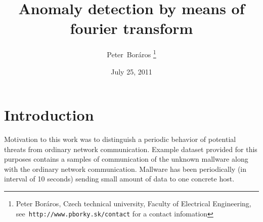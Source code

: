 \documentclass[a4paper]{IEEEtran}
\begin{document}
\title{Anomaly detection by means of fourier transform}
\date{July 25, 2011}
\author{Peter~Boráros %
\thanks{{Peter Boráros}, Czech technical university, Faculty of Electrical Engineering,
see~\texttt{http://www.pborky.sk/contact} for a contact infomation}}%



\maketitle
\IEEEdisplaynotcompsoctitleabstractindextext
\IEEEpeerreviewmaketitle


\section{Introduction}
Motivation to this work was to distinguish a periodic behavior of 
potential threats from ordinary network communication. Example dataset
provided for this purposes contains a samples of communication of the unknown mallware along with the ordinary network communication.
Mallware has been periodically (in interval of 10 seconds) sending small amount of data to one concrete host.
\end{document}
